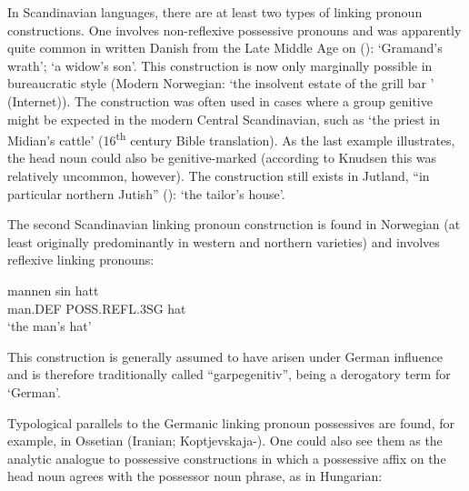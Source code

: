 {{%

In Scandinavian languages, there are at least two types of linking pronoun constructions. One involves non-reflexive possessive pronouns and was apparently quite common in written Danish from the Late Middle Age on (\citet[61]{Knudsen1941}): ‘Gramand’s wrath’;  ‘a widow’s son’. This construction is now only marginally possible in bureaucratic style (Modern Norwegian:  ‘the insolvent estate of the grill bar ’ (Internet)). The construction was often used in cases where a group genitive might be expected in the modern Central Scandinavian, such as  ‘the priest in Midian’s cattle’ (16\textsuperscript{th} century Bible translation). As the last example illustrates, the head noun could also be genitive-marked (according to Knudsen this was relatively uncommon, however). The construction still exists in Jutland, “in particular northern Jutish” (\citet[62]{Knudsen1941}):  ‘the tailor’s house’.


The second Scandinavian linking pronoun construction is found in Norwegian (at least originally predominantly in western and northern varieties) and involves reflexive linking pronouns:


\ea\label{}
\gll mannen  sin  hatt\\
man.DEF  POSS.REFL.3SG  hat\\
\glt ‘the man’s hat’
\z

This construction is generally assumed to have arisen under German influence and is therefore traditionally called “garpegenitiv”,  being a derogatory term for ‘German’.


Typological parallels to the Germanic linking pronoun possessives are found, for example, in Ossetian (Iranian; Koptjevskaja-\citet[669]{Tamm2003}). One could also see them as the analytic analogue to possessive constructions in which a possessive affix on the head noun agrees with the possessor noun phrase, as in Hungarian:

}}

